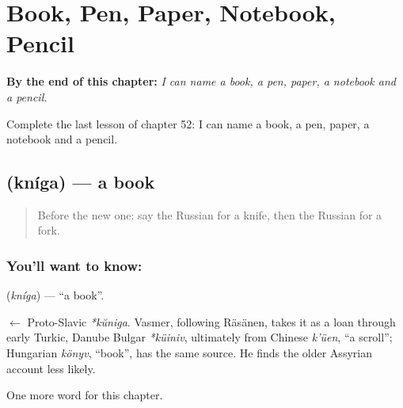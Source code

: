 
\chapter{Book, Pen, Paper, Notebook, Pencil}
\label{ch:ru-book-pen-paper-notebook-pencil}

\begin{chapteropening}
\textbf{By the end of this chapter:} \emph{I can name a book, a pen, paper, a notebook and a pencil.}

Complete the last lesson of chapter 52: I can name a book, a pen, paper, a notebook and a pencil.
\end{chapteropening}

\section[\texorpdfstring{\ru{книга} (kníga)}{книга (kníga)}]{ (kníga) — a book}

\label{lesson:RU-C52-book}



\begin{quote}
Before the new one: say the Russian for a knife, then the Russian for a fork.
\end{quote}

\subsection*{You'll want to know: }
\textbf{} (\emph{kníga}) — \textquotedblleft{}a book\textquotedblright{}.

\begin{cousinweb}
\textbf{} $\leftarrow$ Proto-Slavic \emph{*kŭniga}. Vasmer, following Räsänen, takes it as a loan through early Turkic, Danube Bulgar \emph{*küiniv}, ultimately from Chinese \emph{k'üen}, \textquotedblleft{}a scroll\textquotedblright{}; Hungarian \emph{könyv}, \textquotedblleft{}book\textquotedblright{}, has the same source. He finds the older Assyrian account less likely.
\end{cousinweb}

\begin{grammarlens}[title={What you've built}]
One more word for this chapter.
\end{grammarlens}


